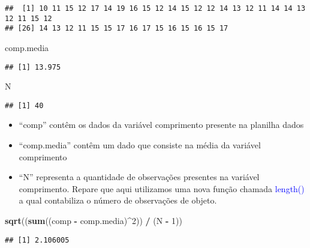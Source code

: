 \documentclass[14pt,titlepage, oneside, openany, a4paper]{book}
\newenvironment{Shaded}{\begin{snugshade}}{\end{snugshade}}
\newcommand{\DecValTok}[1]{\textcolor[rgb]{0.00,0.00,0.81}{#1}}
\newcommand{\KeywordTok}[1]{\textcolor[rgb]{0.13,0.29,0.53}{\textbf{#1}}}
\newcommand{\NormalTok}[1]{#1}
\newcommand{\OperatorTok}[1]{\textcolor[rgb]{0.81,0.36,0.00}{\textbf{#1}}}
\newcommand{\StringTok}[1]{\textcolor[rgb]{0.31,0.60,0.02}{#1}}
\providecommand{\tightlist}{%
  \setlength{\itemsep}{0pt}\setlength{\parskip}{0pt}}
\begin{document}
\begin{verbatim}
##  [1] 10 11 15 12 17 14 19 16 15 12 14 15 12 12 14 13 12 11 14 14 13 12 11 15 12
## [26] 14 13 12 11 15 15 17 16 17 15 16 15 16 15 17
\end{verbatim}

\begin{Shaded}
\begin{Highlighting}[]
\NormalTok{comp.media}
\end{Highlighting}
\end{Shaded}

\begin{verbatim}
## [1] 13.975
\end{verbatim}

\begin{Shaded}
\begin{Highlighting}[]
\NormalTok{N}
\end{Highlighting}
\end{Shaded}

\begin{verbatim}
## [1] 40
\end{verbatim}

\begin{itemize}
\tightlist
\item
  ``comp'' contêm os dados da variável comprimento presente na planilha dados
\item
  ``comp.media'' contêm um dado que consiste na média da variável comprimento
\item
  ``N'' representa a quantidade de observações presentes na variável comprimento. Repare que aqui utilizamos uma nova função chamada \textcolor{blue}{length()} a qual contabiliza o número de observações de objeto.
\end{itemize}

\begin{Shaded}
\begin{Highlighting}[]
\KeywordTok{sqrt}\NormalTok{((}\KeywordTok{sum}\NormalTok{((comp }\OperatorTok{-}\StringTok{ }\NormalTok{comp.media)}\OperatorTok{^}\DecValTok{2}\NormalTok{)) }\OperatorTok{/}\StringTok{ }\NormalTok{(N }\OperatorTok{-}\StringTok{ }\DecValTok{1}\NormalTok{))}
\end{Highlighting}
\end{Shaded}

\begin{verbatim}
## [1] 2.106005
\end{verbatim}

\begin{Shaded}
\end{Shaded}
\end{document}
